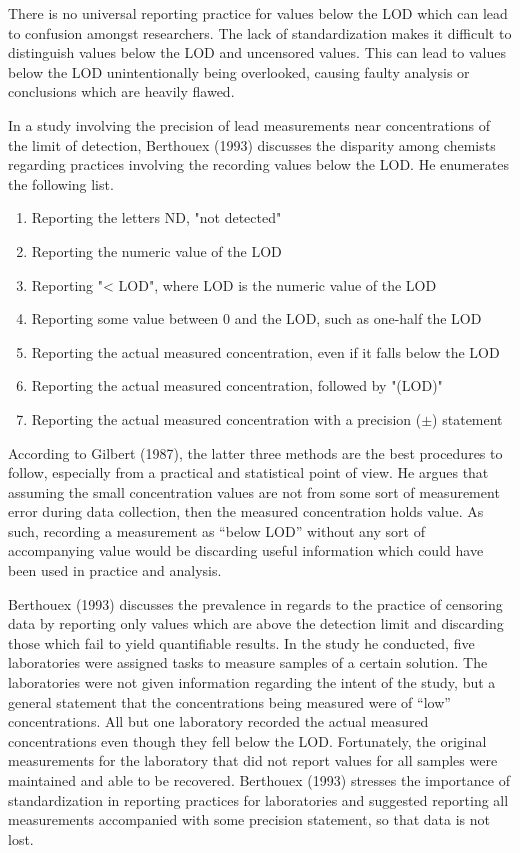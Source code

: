 \documentclass[12pt, twoside]{amherstthesis}
\begin{document}
There is no universal reporting practice for values below the LOD which can lead to confusion amongst researchers. The lack of standardization makes it difficult to distinguish values below the LOD and uncensored values. This can lead to values below the LOD unintentionally being overlooked, causing faulty analysis or conclusions which are heavily flawed.

In a study involving the precision of lead measurements near concentrations of the limit of detection, Berthouex (1993) discusses the disparity among chemists regarding practices involving the recording values below the LOD. He enumerates the following list.
\begin{enumerate}
  \item Reporting the letters ND, "not detected"
  \item Reporting the numeric value of the LOD
  \item Reporting "< LOD", where LOD is the numeric value of the LOD 
  \item Reporting some value between 0 and the LOD, such as one-half the LOD
  \item Reporting the actual measured concentration, even if it falls below the LOD
  \item Reporting the actual measured concentration, followed by "(LOD)" 
  \item Reporting the actual measured concentration with a precision ($\pm$) statement
\end{enumerate}
According to Gilbert (1987), the latter three methods are the best procedures to follow, especially from a practical and statistical point of view. He argues that assuming the small concentration values are not from some sort of measurement error during data collection, then the measured concentration holds value. As such, recording a measurement as ``below LOD'' without any sort of accompanying value would be discarding useful information which could have been used in practice and analysis.

Berthouex (1993) discusses the prevalence in regards to the practice of censoring data by reporting only values which are above the detection limit and discarding those which fail to yield quantifiable results. In the study he conducted, five laboratories were assigned tasks to measure samples of a certain solution. The laboratories were not given information regarding the intent of the study, but a general statement that the concentrations being measured were of ``low'' concentrations. All but one laboratory recorded the actual measured concentrations even though they fell below the LOD. Fortunately, the original measurements for the laboratory that did not report values for all samples were maintained and able to be recovered. Berthouex (1993) stresses the importance of standardization in reporting practices for laboratories and suggested reporting all measurements accompanied with some precision statement, so that data is not lost.
\end{document}

